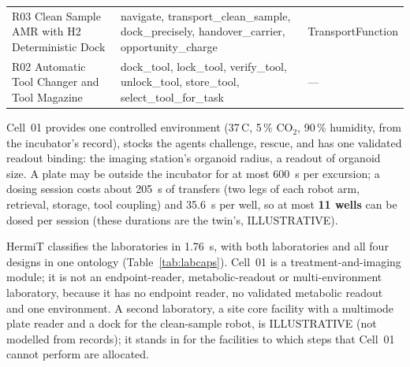 \documentclass[10pt,a4paper]{article}
\begin{document}
\begin{table}[tbp]
\begin{tabularx}{\linewidth}{@{}>{\raggedright\arraybackslash}p{4.0cm}>{\raggedright\arraybackslash}X>{\raggedright\arraybackslash}p{3.6cm}@{}}
R03 Clean Sample AMR with H2 Deterministic Dock & navigate, transport\_\allowbreak{}clean\_\allowbreak{}sample, dock\_\allowbreak{}precisely, handover\_\allowbreak{}carrier, opportunity\_\allowbreak{}charge & TransportFunction \\
R02 Automatic Tool Changer and Tool Magazine & dock\_\allowbreak{}tool, lock\_\allowbreak{}tool, verify\_\allowbreak{}tool, unlock\_\allowbreak{}tool, store\_\allowbreak{}tool, select\_\allowbreak{}tool\_\allowbreak{}for\_\allowbreak{}task & --- \\
\bottomrule\end{tabularx}\end{table}


Cell~01 provides one controlled environment (37\,\textdegree C, 5\,\% CO$_2$,
90\,\% humidity, from the incubator's record), stocks the agents challenge, rescue,
and has one validated readout binding: the imaging station's organoid radius, a readout of organoid size. A plate may
be outside the incubator for at most 600~s per excursion; a dosing session costs about 205~s of
transfers (two legs of each robot arm, retrieval, storage, tool coupling) and 35.6~s per well, so at most
\textbf{11 wells} can be dosed per session (these durations are the twin's, ILLUSTRATIVE).

HermiT classifies the laboratories in 1.76~s, with both laboratories and all four designs in one ontology
(Table~\ref{tab:labcaps}). Cell~01 is a treatment-and-imaging module; it is not an endpoint-reader, metabolic-readout
or multi-environment laboratory, because it has no endpoint reader, no validated metabolic readout and one
environment. A second laboratory, a site core facility with a multimode plate reader and a dock for the clean-sample
robot, is ILLUSTRATIVE (not modelled from records); it stands in for the facilities to which steps that Cell~01
cannot perform are allocated.
\end{document}
